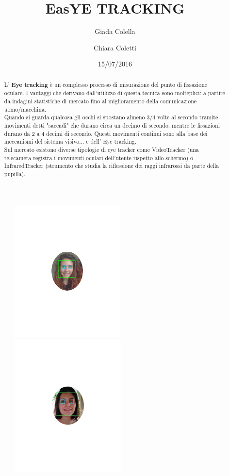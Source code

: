 \documentclass[12pt]{article}
\title{\textbf{EasYE TRACKING}}
\author{Giada Colella \and Chiara Coletti}
\date{15/07/2016}
\begin{document}
	

\begin{figure}
\centering
\includegraphics[width=6cm,height=7.2cm]{im2}%
\qquad\qquad
\includegraphics[width=6.1cm,height=7.25cm]{im}
\end{figure}

\maketitle
\pagebreak

\tableofcontents

\pagebreak

\begin{abstract}
	L' \textbf{Eye tracking} \`e un complesso processo di misurazione del punto di fissazione oculare. I vantaggi che derivano dall'utilizzo di questa tecnica sono molteplici: a partire da indagini statistiche di mercato fino al miglioramento della comunicazione uomo/macchina.\\
	Quando si guarda qualcosa gli occhi si spostano almeno 3/4 volte al secondo tramite movimenti detti "saccadi" che durano circa un decimo di secondo, mentre le fissazioni durano da 2 a 4 decimi di secondo. Questi movimenti continui sono alla base dei meccanismi del sistema visivo... e dell' Eye tracking. \\
	Sul mercato esistono diverse tipologie di eye tracker come VideoTracker (una telecamera registra i movimenti oculari dell'utente rispetto allo schermo) o InfraredTracker (strumento che studia la riflessione dei raggi infrarossi da parte della pupilla).
\end{abstract}
\pagebreak
\end{document}

